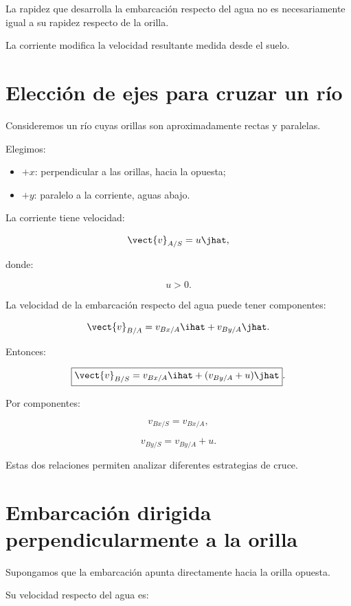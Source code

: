 \begin{advertencia}

La rapidez que desarrolla la embarcación respecto
del agua no es necesariamente igual a su rapidez
respecto de la orilla.

La corriente modifica la velocidad resultante
medida desde el suelo.

\end{advertencia}


\section{Elección de ejes para cruzar un río}

Consideremos un río cuyas orillas son aproximadamente
rectas y paralelas.

Elegimos:

\begin{itemize}
    \item \(+x\): perpendicular a las orillas, hacia la opuesta;
    \item \(+y\): paralelo a la corriente, aguas abajo.
\end{itemize}

La corriente tiene velocidad:

\[
\vect{v}_{A/S}
=
u\jhat,
\]

donde:

\[
u>0.
\]

La velocidad de la embarcación respecto del agua
puede tener componentes:

\[
\vect{v}_{B/A}
=
v_{Bx/A}\ihat+v_{By/A}\jhat.
\]

Entonces:

\[
\boxed{
\vect{v}_{B/S}
=
v_{Bx/A}\ihat
+
(v_{By/A}+u)\jhat
}.
\]

Por componentes:

\[
\boxed{
v_{Bx/S}=v_{Bx/A}
},
\]

\[
\boxed{
v_{By/S}=v_{By/A}+u
}.
\]

Estas dos relaciones permiten analizar diferentes
estrategias de cruce.


\section{Embarcación dirigida perpendicularmente a la orilla}

Supongamos que la embarcación apunta directamente
hacia la orilla opuesta.

Su velocidad respecto del agua es:

